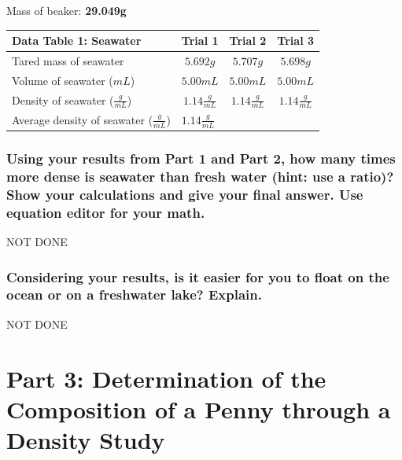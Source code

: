 \documentclass[a4paper,10pt]{article}
\begin{document}
    Mass of beaker: \textbf{29.049g}

    \begin{table}[h!]
      \renewcommand{\arraystretch}{1.5}
      \label{tab:table1}
      \begin{tabular}{|l|c|c|c|}
      \hline
      \textbf{Data Table 1: Seawater} & \textbf{Trial 1} & \textbf{Trial 2} & \textbf{Trial 3}\\
      \hline
      Tared mass of seawater & $5.692g$ & $5.707g$ & $5.698g$ \\
      \hline
      Volume of seawater ($mL$) & $5.00mL$ & $5.00mL$ & $5.00mL$ \\
      \hline
      Density of seawater ($\frac{g}{mL}$) & $1.14\frac{g}{mL}$ &  $1.14\frac{g}{mL}$ & $1.14\frac{g}{mL}$ \\
      \hline
      Average density of seawater ($\frac{g}{mL}$) & \multicolumn{2}{l}{$1.14\frac{g}{mL}$} & \\
      \hline
      \end{tabular}
    \end{table}

    \subsubsection*{Using your results from Part 1 and Part 2, how many times more dense is seawater than fresh water (hint: use a ratio)? Show your calculations and give your final answer. Use equation editor for your math.}
     NOT DONE

    \subsubsection*{Considering your results, is it easier for you to float on the ocean or on a freshwater lake? Explain.}

     NOT DONE

  \section{Part 3: Determination of the Composition of a Penny through a Density Study}
\end{document}
